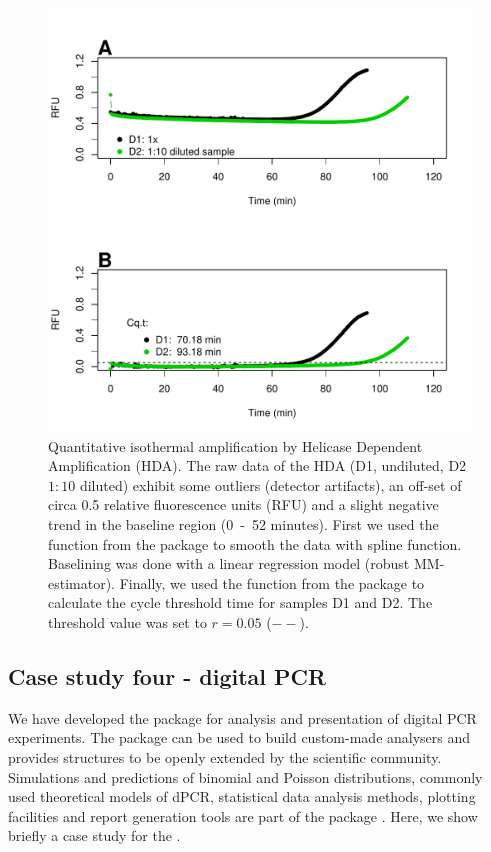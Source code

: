\begin{figure}[htbp]
  \centering
  \includegraphics[clip=true, width=16cm]{figures/qIA.pdf}
  \caption{Quantitative isothermal amplification by Helicase Dependent 
Amplification (HDA).  The raw data of the HDA (D1, undiluted, D2 
$1:10$ diluted) exhibit some outliers (detector artifacts), an off-set of circa 
0.5 relative fluorescence units (RFU) and a slight negative trend in the 
baseline region (0~-~52 minutes).  First we used the  
function from the  package to smooth the data with spline 
function. Baselining was done with a linear regression model (robust 
MM-estimator). Finally, we used the  function from the 
 package to calculate the cycle threshold time for samples D1 
and D2. The threshold value was set to $r = 0.05$ ($--$).}
  \label{figure:qIA}
\end{figure}

\subsection{Case study four - digital PCR}

We have developed the  package for analysis and presentation of 
digital PCR experiments. The  package can be used to build 
custom-made analysers and provides structures to be openly extended by the 
scientific community. Simulations and predictions of binomial and Poisson 
distributions, commonly used theoretical models of dPCR, statistical data 
analysis methods, plotting facilities and report generation tools are part of 
the package \citep{pabinger_2014}. Here, we show briefly a case study for the 
.

